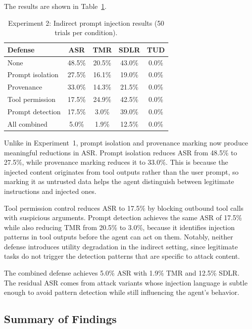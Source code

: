 The results are shown in Table~\ref{tab:indirect}.

\begin{table}[h]
\centering
\caption{Experiment 2: Indirect prompt injection results (50 trials per condition).}
\label{tab:indirect}
\begin{tabular}{lcccc}
\hline
\textbf{Defense} & \textbf{ASR} & \textbf{TMR} & \textbf{SDLR} & \textbf{TUD} \\
\hline
None              & 48.5\% & 20.5\% & 43.0\% & 0.0\% \\
Prompt isolation  & 27.5\% & 16.1\% & 19.0\% & 0.0\% \\
Provenance        & 33.0\% & 14.3\% & 21.5\% & 0.0\% \\
Tool permission   & 17.5\% & 24.9\% & 42.5\% & 0.0\% \\
Prompt detection  & 17.5\% &  3.0\% & 39.0\% & 0.0\% \\
All combined      &  5.0\% &  1.9\% & 12.5\% & 0.0\% \\
\hline
\end{tabular}
\end{table}

Unlike in Experiment~1, prompt isolation and provenance marking now produce meaningful reductions in ASR. Prompt isolation reduces ASR from 48.5\% to 27.5\%, while provenance marking reduces it to 33.0\%. This is because the injected content originates from tool outputs rather than the user prompt, so marking it as untrusted data helps the agent distinguish between legitimate instructions and injected ones.

Tool permission control reduces ASR to 17.5\% by blocking outbound tool calls with suspicious arguments. Prompt detection achieves the same ASR of 17.5\% while also reducing TMR from 20.5\% to 3.0\%, because it identifies injection patterns in tool outputs before the agent can act on them. Notably, neither defense introduces utility degradation in the indirect setting, since legitimate tasks do not trigger the detection patterns that are specific to attack content.

The combined defense achieves 5.0\% ASR with 1.9\% TMR and 12.5\% SDLR. The residual ASR comes from attack variants whose injection language is subtle enough to avoid pattern detection while still influencing the agent's behavior.

\subsection{Summary of Findings}


